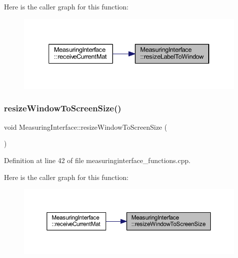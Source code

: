 Here is the caller graph for this function\+:
\nopagebreak
\begin{figure}[H]
\begin{center}
\leavevmode
\includegraphics[width=334pt]{classMeasuringInterface_a167a8fe58e371ea039490e90aa07c87d_icgraph}
\end{center}
\end{figure}
\mbox{\label{classMeasuringInterface_aad66adca9dfebeb4bec1a83c1fd7c043}} 
\subsubsection{\texorpdfstring{resizeWindowToScreenSize()}{resizeWindowToScreenSize()}}
{\footnotesize\ttfamily void Measuring\+Interface\+::resize\+Window\+To\+Screen\+Size (\begin{DoxyParamCaption}{ }\end{DoxyParamCaption})\hspace{0.3cm}{\ttfamily [private]}}



Definition at line 42 of file measuringinterface\+\_\+functions.\+cpp.

Here is the caller graph for this function\+:
\nopagebreak
\begin{figure}[H]
\begin{center}
\leavevmode
\includegraphics[width=350pt]{classMeasuringInterface_aad66adca9dfebeb4bec1a83c1fd7c043_icgraph}
\end{center}
\end{figure}
\mbox{\label{classMeasuringInterface_a1c458529cab62e1c2aa540107aa5285a}} 
